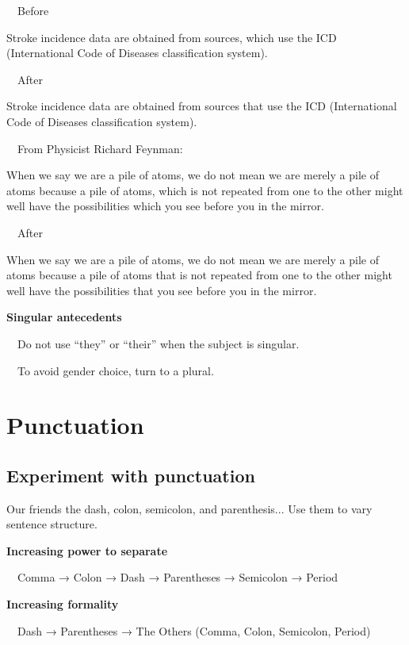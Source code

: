 \documentclass[a4paper, 12pt]{article}
\begin{document}
\newpage\par\ \textbullet\ Before
\par Stroke incidence data are obtained from sources, which use the ICD (International Code of Diseases classification system).

\par\ \textbullet\ After
\par Stroke incidence data are obtained from sources that use the ICD (International Code of Diseases classification system).

\par\ \textbullet\ From Physicist Richard Feynman:
\par When we say we are a pile of atoms, we do not mean we are merely a pile of atoms because a pile of atoms, which is not repeated from one to the other might well have the possibilities which you see before you in the mirror.

\par\ \textbullet\ After
\par When we say we are a pile of atoms, we do not mean we are merely a pile of atoms because a pile of atoms that is not repeated from one to the other might well have the possibilities that you see before you in the mirror.

\textbf{Singular antecedents}
\par\ \textbullet\ Do not use ``they'' or ``their'' when the subject is singular.
\par\ \textbullet\ To avoid gender choice, turn to a plural.

\newpage\section{Punctuation}

\subsection{Experiment with punctuation}

Our friends the dash, colon, semicolon, and parenthesis... Use them to vary sentence structure.

\textbf{Increasing power to separate}
\par\ \textbullet\ Comma → Colon → Dash → Parentheses → Semicolon → Period

\textbf{Increasing formality}
\par\ \textbullet\ Dash → Parentheses → The Others (Comma, Colon, Semicolon, Period)
\end{document}
